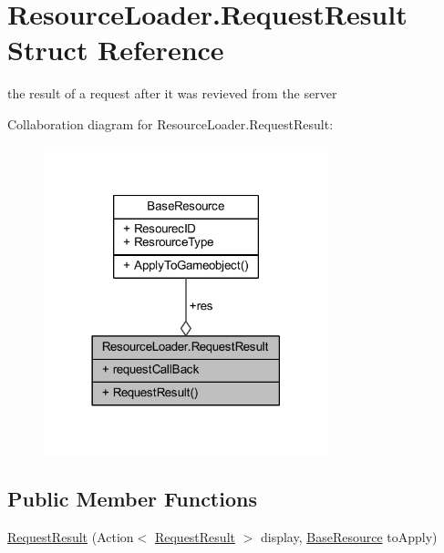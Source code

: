 \hypertarget{struct_resource_loader_1_1_request_result}{}\section{Resource\+Loader.\+Request\+Result Struct Reference}
\label{struct_resource_loader_1_1_request_result}


the result of a request after it was revieved from the server  




Collaboration diagram for Resource\+Loader.\+Request\+Result\+:
\nopagebreak
\begin{figure}[H]
\begin{center}
\leavevmode
\includegraphics[width=234pt]{struct_resource_loader_1_1_request_result__coll__graph}
\end{center}
\end{figure}
\subsection*{Public Member Functions}
\begin{DoxyCompactItemize}
\item 
\mbox{\hyperlink{struct_resource_loader_1_1_request_result_ad45093e71854563c37697c621b1ae5a7}{Request\+Result}} (Action$<$ \mbox{\hyperlink{struct_resource_loader_1_1_request_result}{Request\+Result}} $>$ display, \mbox{\hyperlink{class_base_resource}{Base\+Resource}} to\+Apply)
\end{DoxyCompactItemize}
